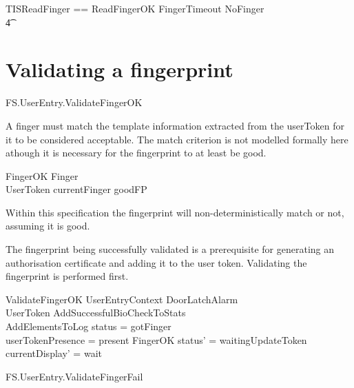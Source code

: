 \begin{zed}
        TISReadFinger == ReadFingerOK \lor
        FingerTimeout \lor NoFinger 
\\ \t4  \lor [~ UserTokenTorn | status = waitingFinger ~]
\end{zed}

\section{Validating a fingerprint}

\begin{traceunit}{FS.UserEntry.ValidateFingerOK}
\end{traceunit}


A finger must match the template information extracted from the
userToken for it to be considered acceptable. The match criterion is
not modelled formally here athough it is necessary for the 
fingerprint to at least be good.

\begin{schema}{FingerOK}
        Finger
\\      UserToken
\where
        currentFinger \in \ran goodFP
\end{schema}

Within this specification the fingerprint will non-deterministically
match or not, assuming it is good.

The fingerprint being successfully validated is a prerequisite for
generating an authorisation certificate and adding it to the user token.
Validating the fingerprint is performed first.

\begin{schema}{ValidateFingerOK}
	UserEntryContext
\also
	\Xi DoorLatchAlarm
\\      \Xi UserToken
\also
        AddSuccessfulBioCheckToStats
\\      AddElementsToLog
\where
	status = gotFinger
\\      userTokenPresence = present
\also
        FingerOK
\also
	status' = waitingUpdateToken
\\	currentDisplay' = wait
\end{schema}


\begin{traceunit}{FS.UserEntry.ValidateFingerFail}
\end{traceunit}


